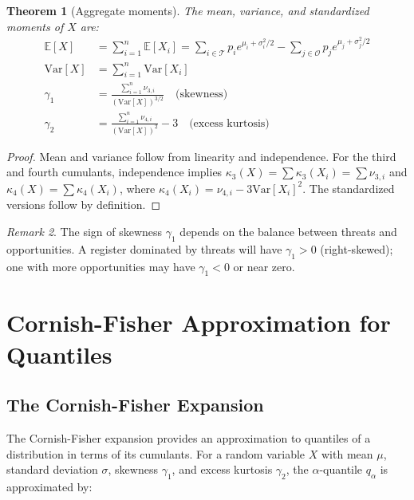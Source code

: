 \documentclass[12pt,a4paper]{article}
\newtheorem{theorem}{Theorem}[section]
\theoremstyle{definition}
\theoremstyle{remark}
\newtheorem{remark}[theorem]{Remark}
\newcommand{\E}{\mathbb{E}}
\newcommand{\Var}{\mathrm{Var}}
\begin{document}
\begin{theorem}[Aggregate moments]
\label{thm:aggregate_moments}
The mean, variance, and standardized moments of $X$ are:
\begin{align}
    \E[X] &= \sum_{i=1}^n \E[X_i] = \sum_{i \in \mathcal{T}} p_i e^{\mu_i + \sigma_i^2/2} - \sum_{j \in \mathcal{O}} p_j e^{\mu_j + \sigma_j^2/2} \\
    \Var[X] &= \sum_{i=1}^n \Var[X_i] \\
    \gamma_1 &= \frac{\sum_{i=1}^n \nu_{3,i}}{(\Var[X])^{3/2}} \quad \text{(skewness)} \\
    \gamma_2 &= \frac{\sum_{i=1}^n \nu_{4,i}}{(\Var[X])^2} - 3 \quad \text{(excess kurtosis)}
\end{align}
\end{theorem}

\begin{proof}
Mean and variance follow from linearity and independence. For the third and fourth cumulants, independence implies $\kappa_3(X) = \sum \kappa_3(X_i) = \sum \nu_{3,i}$ and $\kappa_4(X) = \sum \kappa_4(X_i)$, where $\kappa_4(X_i) = \nu_{4,i} - 3\Var[X_i]^2$. The standardized versions follow by definition.
\end{proof}

\begin{remark}
The sign of skewness $\gamma_1$ depends on the balance between threats and opportunities. A register dominated by threats will have $\gamma_1 > 0$ (right-skewed); one with more opportunities may have $\gamma_1 < 0$ or near zero.
\end{remark}

\section{Cornish-Fisher Approximation for Quantiles}
\label{sec:approximation}

\subsection{The Cornish-Fisher Expansion}

The Cornish-Fisher expansion \citep{Cornish1938} provides an approximation to quantiles of a distribution in terms of its cumulants. For a random variable $X$ with mean $\mu$, standard deviation $\sigma$, skewness $\gamma_1$, and excess kurtosis $\gamma_2$, the $\alpha$-quantile $q_\alpha$ is approximated by:
\end{document}
